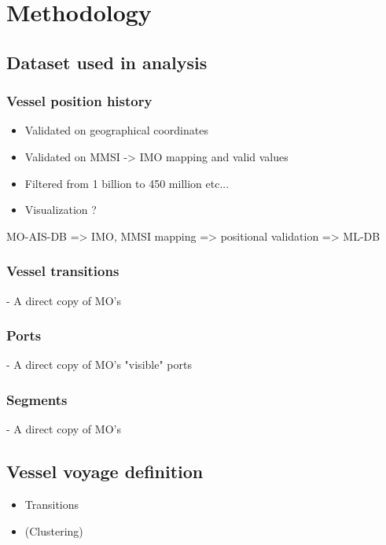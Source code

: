 \chapter{Methodology}


\section{Dataset used in analysis}


\subsection{Vessel position history}

\begin{itemize}
    \item Validated on geographical coordinates
    \item Validated on MMSI -> IMO mapping and valid values
    \item Filtered from 1 billion to 450 million etc...
    \item Visualization ?
\end{itemize}

MO-AIS-DB => IMO, MMSI mapping => positional validation => ML-DB

\subsection{Vessel transitions}

 - A direct copy of MO's

\subsection{Ports}

 - A direct copy of MO's "visible" ports

\subsection{Segments}

 - A direct copy of MO's


\section{Vessel voyage definition}

\begin{itemize}
    \item Transitions
    \item (Clustering)
\end{itemize}


